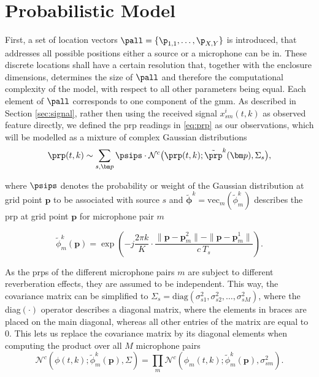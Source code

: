\section{Probabilistic Model}
\label{sec:prob_model}

First, a set of location vectors $\pall=\{\p_{1,1},\dots,\p_{X,Y}\}$ is introduced, that addresses all possible positions either a source or a microphone can be in. These discrete locations shall have a certain resolution that, together with the enclosure dimensions, determines the size of $\pall$ and therefore the computational complexity of the model, with respect to all other parameters being equal. Each element of $\pall$ corresponds to one component of the \gls{gmm}. 
As described in Section \ref{sec:signal}, rather then using the received signal $x_{sm}^i(t,k)$ as observed feature directly, we defined the \gls{prp} readings in \eqref{eq:prp} as our observations, which will be modelled as a mixture of complex Gaussian distributions
\begin{equation}
	\prp(t,k)\sim\sum_{s,\bm p}\psips\cdot\mathcal{N}^c\big(\prp(t,k);\tilde\prp^k(\bm p),\Sigma_s\big),
\label{eq:phi_gmm}
\end{equation}

where $\psips$ denotes the probability or weight of the Gaussian distribution at grid point $\bm p$ to be associated with source $s$ and $\tilde{\bm\phi}^k=\text{vec}_{m}(\tilde\phi^k_m)$ describes the \gls{prp} at grid point $\bm p$ for microphone pair $m$

\begin{equation}
    \tilde\phi^k_m(\bm p)=\exp{\left (-j\frac{2\pi k}{K}\cdot\frac{\|\bm p-\bm p^2_m\|-\|\bm p-\bm p^1_m\|}{c~T_s}\right )}.
\label{eq:phi_tilde}
\end{equation}

As the \glspl{prp} of the different microphone pairs $m$ are subject to different reverberation effects, they are assumed to be independent. This way, the covariance matrix can be simplified to $\Sigma_s=\text{diag}(\sigma^2_{s1}, \sigma^2_{s2}, \dots, \sigma^2_{sM})$, where the diag$(\cdot)$ operator describes a diagonal matrix, where the elements in braces are placed on the main diagonal, whereas all other entries of the matrix are equal to 0. This lets us replace the covariance matrix by its diagonal elements when computing the product over all $M$ microphone pairs 
\begin{equation}
    \mathcal{N}^c(\phi(t,k);\tilde\phi^k_m(\bm p),\Sigma)=\prod_m \mathcal{N}^c(\phi_m(t,k);\tilde\phi^k_m(\bm p),\sigma^2_{sm}).
\end{equation}

